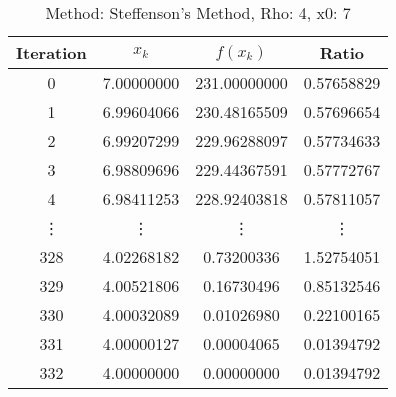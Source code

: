 \begin{table}
\centering
\caption{Method: Steffenson's Method, Rho: 4, x0: 7}
\label{tab:table_Steffenson's_Method_4_7}
\begin{tabular}{c c c c}
\toprule
Iteration &      $x_k$ &     $f(x_k)$ &      Ratio \\
\midrule
        0 & 7.00000000 & 231.00000000 & 0.57658829 \\
        1 & 6.99604066 & 230.48165509 & 0.57696654 \\
        2 & 6.99207299 & 229.96288097 & 0.57734633 \\
        3 & 6.98809696 & 229.44367591 & 0.57772767 \\
        4 & 6.98411253 & 228.92403818 & 0.57811057 \\
   \vdots &     \vdots &       \vdots &     \vdots \\
      328 & 4.02268182 &   0.73200336 & 1.52754051 \\
      329 & 4.00521806 &   0.16730496 & 0.85132546 \\
      330 & 4.00032089 &   0.01026980 & 0.22100165 \\
      331 & 4.00000127 &   0.00004065 & 0.01394792 \\
      332 & 4.00000000 &   0.00000000 & 0.01394792 \\
\bottomrule
\end{tabular}
\end{table}
